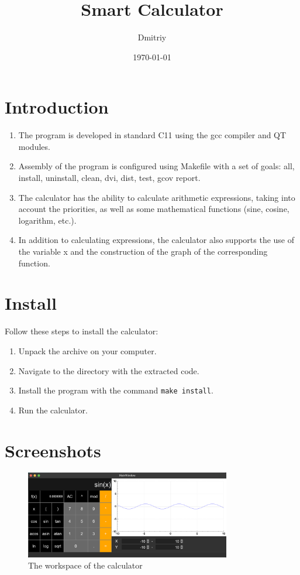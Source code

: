 \documentclass{article}
\title{Smart Calculator}
\author{Dmitriy}
\date{\today}
\begin{document}
\maketitle
\tableofcontents
\clearpage

\section{Introduction}
\begin{enumerate}
  \item The program is developed in standard C11 using the gcc compiler and QT modules.
  \item Assembly of the program is configured using Makefile with a set of goals: all, install, uninstall, clean, dvi, dist, test, gcov report.
  \item The calculator has the ability to calculate arithmetic expressions, taking into account the priorities, as well as some mathematical functions (sine, cosine, logarithm, etc.).
  \item In addition to calculating expressions, the calculator also supports the use of the variable x and the construction of the graph of the corresponding function.
\end{enumerate}

\section{Install}
Follow these steps to install the calculator:
\begin{enumerate}
  \item Unpack the archive on your computer.
  \item Navigate to the directory with the extracted code.
  \item Install the program with the command \texttt{make install}.
  \item Run the calculator.
\end{enumerate}

\section{Screenshots}
\begin{figure}[htbp]
  \centering
  \includegraphics[width=0.8\textwidth]{screenshots/screenshot1.png}
  \caption{The workspace of the calculator}
  \label{fig:screenshot1}
\end{figure}
\end{document}
